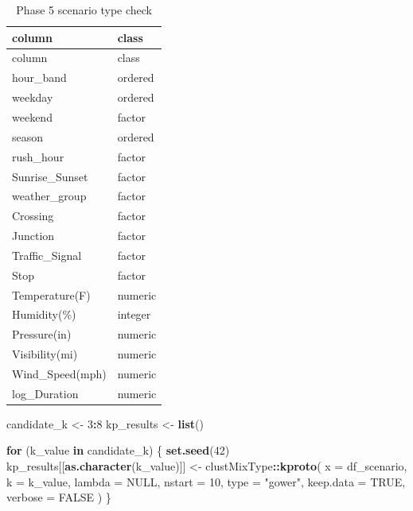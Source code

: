 \documentclass[
]{article}
\newenvironment{Shaded}{\begin{snugshade}}{\end{snugshade}}
\newcommand{\AttributeTok}[1]{\textcolor[rgb]{0.13,0.29,0.53}{#1}}
\newcommand{\ConstantTok}[1]{\textcolor[rgb]{0.56,0.35,0.01}{#1}}
\newcommand{\ControlFlowTok}[1]{\textcolor[rgb]{0.13,0.29,0.53}{\textbf{#1}}}
\newcommand{\DecValTok}[1]{\textcolor[rgb]{0.00,0.00,0.81}{#1}}
\newcommand{\FunctionTok}[1]{\textcolor[rgb]{0.13,0.29,0.53}{\textbf{#1}}}
\newcommand{\NormalTok}[1]{#1}
\newcommand{\OtherTok}[1]{\textcolor[rgb]{0.56,0.35,0.01}{#1}}
\newcommand{\SpecialCharTok}[1]{\textcolor[rgb]{0.81,0.36,0.00}{\textbf{#1}}}
\newcommand{\StringTok}[1]{\textcolor[rgb]{0.31,0.60,0.02}{#1}}
\begin{document}
\begin{longtable}[]{@{}ll@{}}
\caption{Phase 5 scenario type check}\tabularnewline
\toprule\noalign{}
column & class \\
\midrule\noalign{}
\endfirsthead
\toprule\noalign{}
column & class \\
\midrule\noalign{}
\endhead
\bottomrule\noalign{}
\endlastfoot
hour\_band & ordered \\
weekday & ordered \\
weekend & factor \\
season & ordered \\
rush\_hour & factor \\
Sunrise\_Sunset & factor \\
weather\_group & factor \\
Crossing & factor \\
Junction & factor \\
Traffic\_Signal & factor \\
Stop & factor \\
Temperature(F) & numeric \\
Humidity(\%) & integer \\
Pressure(in) & numeric \\
Visibility(mi) & numeric \\
Wind\_Speed(mph) & numeric \\
log\_Duration & numeric \\
\end{longtable}

\begin{Shaded}
\begin{Highlighting}[]
\NormalTok{candidate\_k }\OtherTok{\textless{}{-}} \DecValTok{3}\SpecialCharTok{:}\DecValTok{8}
\NormalTok{kp\_results }\OtherTok{\textless{}{-}} \FunctionTok{list}\NormalTok{()}

\ControlFlowTok{for}\NormalTok{ (k\_value }\ControlFlowTok{in}\NormalTok{ candidate\_k) \{}
  \FunctionTok{set.seed}\NormalTok{(}\DecValTok{42}\NormalTok{)}
\NormalTok{  kp\_results[[}\FunctionTok{as.character}\NormalTok{(k\_value)]] }\OtherTok{\textless{}{-}}\NormalTok{ clustMixType}\SpecialCharTok{::}\FunctionTok{kproto}\NormalTok{(}
    \AttributeTok{x =}\NormalTok{ df\_scenario,}
    \AttributeTok{k =}\NormalTok{ k\_value,}
    \AttributeTok{lambda =} \ConstantTok{NULL}\NormalTok{,}
    \AttributeTok{nstart =} \DecValTok{10}\NormalTok{,}
    \AttributeTok{type =} \StringTok{"gower"}\NormalTok{,}
    \AttributeTok{keep.data =} \ConstantTok{TRUE}\NormalTok{,}
    \AttributeTok{verbose =} \ConstantTok{FALSE}
\NormalTok{  )}
\NormalTok{\}}
\end{Highlighting}
\end{Shaded}
\end{document}

